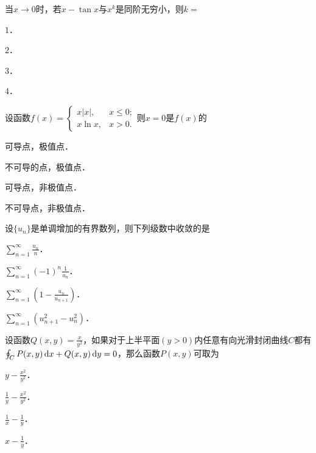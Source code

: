 \documentclass[plain,noanswer,medmath]{../../template/jnuexam}
\begin{document}




\begin{problem}
当$x \to 0$时，若$x - \tan x$与$x^k$是同阶无穷小，则$k =$\pickout{}
\begin{abcd}
\item $1$．
\item $2$．
\item $3$．
\item $4$．
\end{abcd}
\end{problem}


\begin{problem}
设函数$f(x) = \begin{cases}
    x|x|, & x \le 0; \\
  x\ln x, & x > 0.
\end{cases}$则$x = 0$是$f(x)$的\pickout{}
\begin{abcd}
\item 可导点，极值点．
\item 不可导的点，极值点．
\item 可导点，非极值点．
\item 不可导点，非极值点．
\end{abcd}
\end{problem}


\begin{problem}
设$\{u_n\}$是单调增加的有界数列，则下列级数中收敛的是\pickout{}
\begin{abcd}
\item $\sum_{n = 1}^{\infty}\frac{u_n}{n}$．
\item $\sum_{n = 1}^{\infty}(- 1)^n\frac{1}{u_n}$．
\item $\sum_{n = 1}^{\infty}\left(1 - \frac{u_n}{u_{n + 1}} \right)$．
\item $\sum_{n = 1}^{\infty}(u_{n + 1}^2 - u_n^2)$．
\end{abcd}
\end{problem}


\begin{problem}
设函数$Q(x,y) = \frac{x}{y^2}$，如果对于上半平面$(y > 0)$内任意有向光滑封闭曲线$C$都有
$\oint_C P(x,y)\mathop{}\!\mathrm{d} x + Q(x,y)\mathop{}\!\mathrm{d} y = 0$，那么函数$P(x,y)$可取为\pickout{}
\begin{abcd}
\item $y - \frac{x^2}{y^2}$．
\item $\frac{1}{y} - \frac{x^2}{y^2}$．
\item $\frac{1}{x} - \frac{1}{y}$．
\item $x - \frac{1}{y}$．
\end{abcd}
\end{problem}
\end{document}

